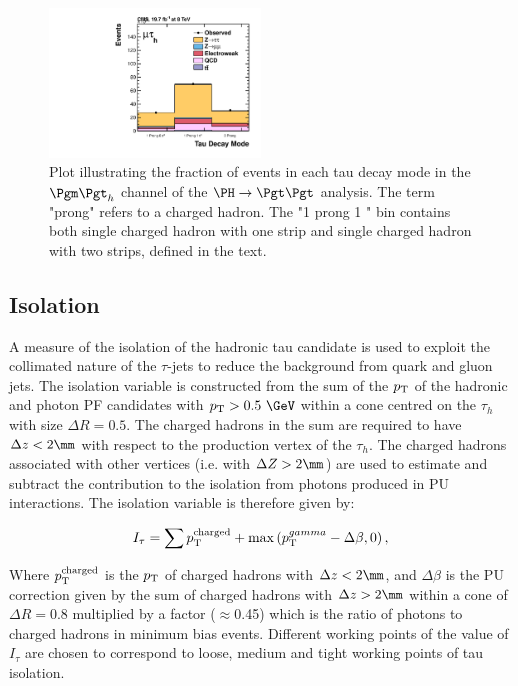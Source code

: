 \begin{figure}
\begin{center}
    \includegraphics[width=0.5\textwidth]
      {plots/reco/tau_decay_mode_inclusive_mt_2012.pdf}
\end{center}
\caption{Plot illustrating the fraction of events in each tau decay mode in the
$\mutau$ channel of the $\PH\to\Pgt\Pgt$ analysis. The term "prong" refers to a
charged hadron. The "1 prong 1 \Pgpz" bin contains both single charged hadron
with one strip and single charged hadron with two strips, defined in the text.
}
\label{fig:taudecaymode}
\end{figure}

\subsection{Isolation}

A measure of the isolation of the hadronic tau candidate is used to exploit the
collimated nature of the $\tau$-jets to reduce the background from quark and gluon
jets. The isolation variable is constructed from the sum of the $p_{\mathrm{T}}$ of the
hadronic and photon \ac{PF} candidates with $\pt > 0.5~\GeV$ within a cone centred on 
the $\tau_{h}$ with size $\Delta R = 0.5$. The charged hadrons in the sum are
required to have $\Delta z < 2\mm$ with respect to the production vertex of the
$\tau_{h}$. The charged hadrons associated with other vertices (i.e. with
$\Delta Z > 2\mm$) are used to
estimate and subtract the contribution to the isolation from photons produced in
\ac{PU} interactions. The isolation variable is therefore given by:

\begin{equation}
I_{\tau} = \sum p_{\mathrm{T}}^{\text{charged}} + \max \left( p_{\mathrm{T}}^{gamma} - \Delta \beta,
0 \right) , 
\label{eq:tauIsolation}
\end{equation}

Where $p_{\mathrm{T}}^{\text{charged}}$ is the $p_{\mathrm{T}}$ of charged hadrons with $\Delta z < 2\mm$, and
$\Delta \beta$ is the \ac{PU} correction given by the sum of charged hadrons with $\Delta
z > 2\mm$ within a cone of $\Delta R = 0.8$ multiplied by a factor ($\approx$0.45) which is the
ratio of photons to charged hadrons in minimum bias events. Different working
points of the value of $I_{\tau}$ are chosen to correspond to loose, medium and
tight working points of tau isolation.

